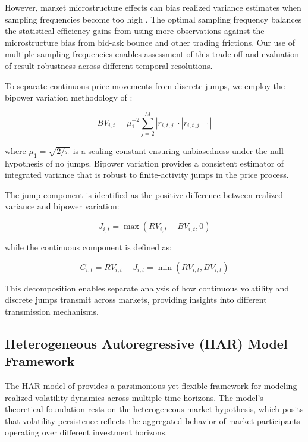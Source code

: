 However, market microstructure effects can bias realized variance estimates when sampling frequencies become too high \citep{hansen2005realized}. The optimal sampling frequency balances the statistical efficiency gains from using more observations against the microstructure bias from bid-ask bounce and other trading frictions. Our use of multiple sampling frequencies enables assessment of this trade-off and evaluation of result robustness across different temporal resolutions.

To separate continuous price movements from discrete jumps, we employ the bipower variation methodology of \citet{barndorff2004power}:

\begin{equation} \label{eq:bipower_variation}
BV_{i,t} = \mu_1^{-2} \sum_{j=2}^{M} |r_{i,t,j}| \cdot |r_{i,t,j-1}|
\end{equation}

where $\mu_1 = \sqrt{2/\pi}$ is a scaling constant ensuring unbiasedness under the null hypothesis of no jumps. Bipower variation provides a consistent estimator of integrated variance that is robust to finite-activity jumps in the price process.

The jump component is identified as the positive difference between realized variance and bipower variation:

\begin{equation} \label{eq:jump_component}
J_{i,t} = \max(RV_{i,t} - BV_{i,t}, 0)
\end{equation}

while the continuous component is defined as:

\begin{equation} \label{eq:continuous_component}
C_{i,t} = RV_{i,t} - J_{i,t} = \min(RV_{i,t}, BV_{i,t})
\end{equation}

This decomposition enables separate analysis of how continuous volatility and discrete jumps transmit across markets, providing insights into different transmission mechanisms.

\subsection{Heterogeneous Autoregressive (HAR) Model Framework}

The HAR model of \citet{corsi2009simple} provides a parsimonious yet flexible framework for modeling realized volatility dynamics across multiple time horizons. The model's theoretical foundation rests on the heterogeneous market hypothesis, which posits that volatility persistence reflects the aggregated behavior of market participants operating over different investment horizons.

